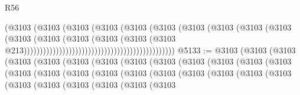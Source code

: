 \begin{lexlean}{R56}
\begin{coremodule}
                                                                  (@3103
                                                                    (@3103
                                                                      (@3103
                                                                        (@3103
                                                                          (@3103
                                                                            (@3103
                                                                              (@3103
                                                                                (@3103
                                                                                  (@3103
                                                                                    (@3103
                                                                                      (@3103
                                                                                        (@3103
                                                                                          (@3103
                                                                                            (@3103
                                                                                              (@3103
                                                                                                (@3103
                                                                                                  @213)))))))))))))))))))))))))))))))))))))))))))))))
@5133 := @3103
    (@3103
      (@3103
        (@3103
          (@3103
            (@3103
              (@3103
                (@3103
                  (@3103
                    (@3103
                      (@3103
                        (@3103
                          (@3103
                            (@3103
                              (@3103
                                (@3103
                                  (@3103
                                    (@3103
                                      (@3103
                                        (@3103
                                          (@3103
                                            (@3103
                                              (@3103
                                                (@3103
                                                  (@3103
                                                    (@3103
                                                      (@3103
                                                        (@3103
                                                          (@3103

\end{coremodule}
\end{lexlean}
